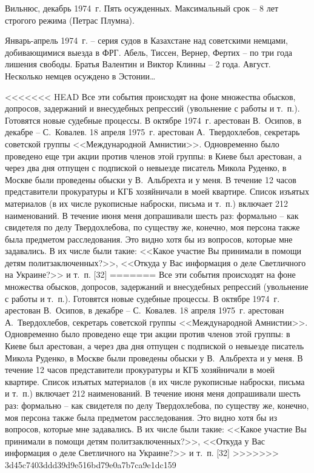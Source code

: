 \documentclass{book}
\begin{document}
Вильнюс, декабрь 1974~г. Пять осужденных. Максимальный срок -- 8 лет строгого режима (Петрас Плумна).

Январь-апрель 1974~г. -- серия судов в Казахстане над советскими немцами, добивающимися выезда в ФРГ. Абель, Тиссен, Вернер, Фертих -- по три года лишения свободы. Братья Валентин и Виктор Клинны -- 2 года. Август. Несколько нем­цев осуждено в Эстонии\ldots

<<<<<<< HEAD
Все эти события происходят на фоне множества обысков, допросов, задержаний и внесудебных репрессий (увольнение с работы и т.~п.). Готовятся новые судебные процессы. В октябре 1974~г. арестован В.~Осипов, в декабре -- С.~Ковалев. 18 апреля 1975~г. арестован А.~Твердохлебов, секретарь советской группы <<Международной Амнистии>>. Одновременно было проведено еще три акции против членов этой группы: в Киеве был арестован, а через два дня отпущен с подпиской о невыезде писатель Микола Руденко, в Москве были проведены обыски у В.~Альбрехта и у меня. В течение 12 часов представители прокуратуры и КГБ хозяйничали в моей квартире. Список изъятых материалов (в их числе рукописные наброски, письма и т.~п.) включает 212 наименований. В течение июня меня допрашивали шесть раз: формально -- как свидетеля по делу Твердохлебова, по существу же, конечно, моя персона также была предметом расследования. Это видно хотя бы из вопросов, которые мне задавались. В их числе были такие: <<Какое участие Вы принимали в помощи детям политзаключенных?>>, <<Откуда у Вас информация о деле Светличного на Украине?>> и т.~п. [32]
=======
Все эти события происходят на фоне множества обысков, допросов, задержаний и внесудебных репрессий (увольнение с работы и т.~п.). Готовятся новые судебные процессы. В октябре 1974~г. арестован В.~Осипов, в декабре -- С.~Ковалев. 18 апреля 1975~г. арестован А.~Твердохлебов, секретарь советской группы <<Международной Амнистии>>. Одновременно было проведено еще три акции против членов этой группы: в Киеве был арестован, а через два дня отпущен с подпиской о невыезде писатель Микола Руденко, в Москве были проведены обыски у В.~Альбрехта и у меня. В течение 12 часов представители прокуратуры и КГБ хозяйничали в моей квартире. Список изъятых материалов (в их числе рукописные наброски, письма и т.~п.) включает 212 наименований. В течение июня меня допрашивали шесть раз: формально -- как свидетеля по делу Твердохлебова, по существу же, конечно, моя персона также была предметом расследования. Это видно хотя бы из вопросов, которые мне задавались. В их числе были такие: <<Какое участие Вы принимали в помощи детям 
политзаключенных?>>, <<Откуда у Вас информация о деле Светличного на Украине?>> и т.~п. [32]
>>>>>>> 3d45c7403ddd39d9e516bd79e0a7b7ca9e1dc159
\end{document}
